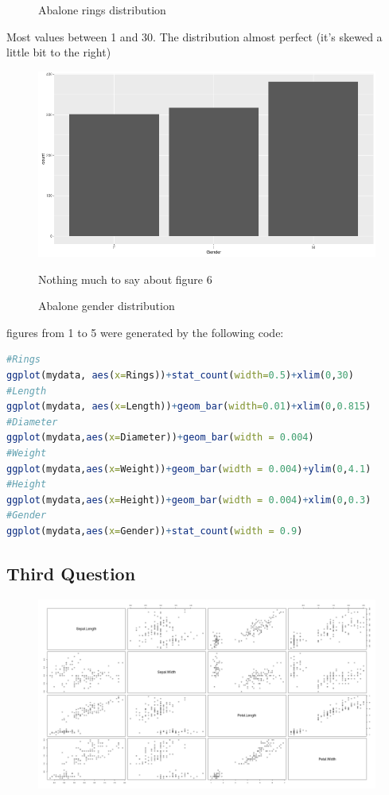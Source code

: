 \documentclass{article}
\begin{document}
\begin{multicols*}{2}
\begin{figure}[H]
\begin{center}
	\end{center}
	\caption{Abalone rings distribution}
\end{figure}
Most values between 1 and 30. The distribution almost perfect (it's skewed a little bit to the right)
\begin{figure}[H]
	\begin{center}
		\includegraphics[scale=0.3]{ggplotGender.png}
	\end{center}
	\caption{Abalone gender distribution}
	Nothing much to say about figure 6
\end{figure}

figures from 1 to 5 were generated by the following code:
\begin{lstlisting}[language=R]
#Rings
ggplot(mydata, aes(x=Rings))+stat_count(width=0.5)+xlim(0,30)
#Length
ggplot(mydata, aes(x=Length))+geom_bar(width=0.01)+xlim(0,0.815)
#Diameter
ggplot(mydata,aes(x=Diameter))+geom_bar(width = 0.004)
#Weight
ggplot(mydata,aes(x=Weight))+geom_bar(width = 0.004)+ylim(0,4.1)
#Height
ggplot(mydata,aes(x=Height))+geom_bar(width = 0.004)+xlim(0,0.3)
#Gender
ggplot(mydata,aes(x=Gender))+stat_count(width = 0.9)
\end{lstlisting}
\end{multicols*}
\begin{landscape}
{\centering\section*{Third Question}}
\begin{figure}[H]
	\begin{center}
		\includegraphics[scale=0.5]{scatterplotall.png}
	\end{center}
\end{figure}
\end{landscape}
\end{document}
